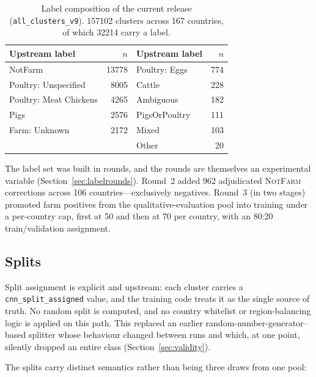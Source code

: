 \documentclass[11pt,a4paper]{article}
\newcommand{\code}[1]{\texttt{\small #1}}
\begin{document}
\begin{table}[t]
\centering
\small
\caption{Label composition of the current release (\code{all\_clusters\_v9}).
\num{157102} clusters across 167 countries, of which \num{32214} carry a label.}
\label{tab:labels}
\begin{tabular}{lrlr}
\toprule
Upstream label & $n$ & Upstream label & $n$ \\
\midrule
NotFarm                  & \num{13778} & Poultry: Eggs      & \num{774}  \\
Poultry: Unspecified     & \num{8005}  & Cattle             & \num{228}  \\
Poultry: Meat Chickens   & \num{4265}  & Ambiguous          & \num{182}  \\
Pigs                     & \num{2576}  & PigsOrPoultry      & \num{111}  \\
Farm: Unknown            & \num{2172}  & Mixed              & \num{103}  \\
                         &             & Other              & \num{20}   \\
\bottomrule
\end{tabular}
\end{table}

The label set was built in rounds, and the rounds are themselves an experimental
variable (Section~\ref{sec:labelrounds}). Round~2 added \num{962} adjudicated
\textsc{NotFarm} corrections across 106 countries---exclusively negatives.
Round~3 (in two stages) promoted farm positives from the qualitative-evaluation
pool into training under a per-country cap, first at 50 and then at 70 per
country, with an 80:20 train/validation assignment.

\subsection{Splits}
\label{sec:splits}

Split assignment is explicit and upstream: each cluster carries a
\code{cnn\_split\_assigned} value, and the training code treats it as the single
source of truth. No random split is computed, and no country whitelist or
region-balancing logic is applied on this path. This replaced an earlier
random-number-generator--based splitter whose behaviour changed between runs and
which, at one point, silently dropped an entire class (Section~\ref{sec:validity}).

The splits carry distinct semantics rather than being three draws from one pool:
\end{document}
